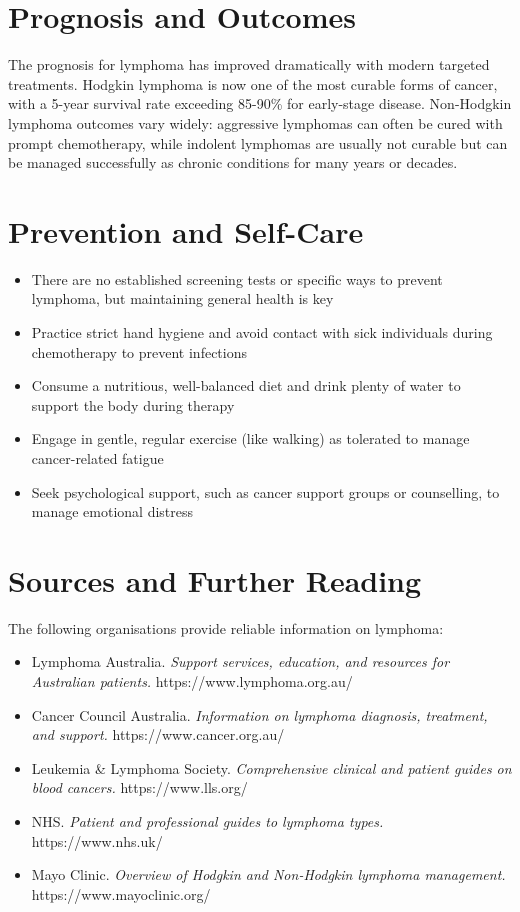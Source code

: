 \section*{Prognosis and Outcomes}
The prognosis for lymphoma has improved dramatically with modern targeted treatments. Hodgkin lymphoma is now one of the most curable forms of cancer, with a 5-year survival rate exceeding 85-90\% for early-stage disease. Non-Hodgkin lymphoma outcomes vary widely: aggressive lymphomas can often be cured with prompt chemotherapy, while indolent lymphomas are usually not curable but can be managed successfully as chronic conditions for many years or decades.

\section*{Prevention and Self-Care}
\begin{itemize}
    \item There are no established screening tests or specific ways to prevent lymphoma, but maintaining general health is key
    \item Practice strict hand hygiene and avoid contact with sick individuals during chemotherapy to prevent infections
    \item Consume a nutritious, well-balanced diet and drink plenty of water to support the body during therapy
    \item Engage in gentle, regular exercise (like walking) as tolerated to manage cancer-related fatigue
    \item Seek psychological support, such as cancer support groups or counselling, to manage emotional distress
\end{itemize}

\section*{Sources and Further Reading}
The following organisations provide reliable information on lymphoma:

\begin{itemize}
    \item Lymphoma Australia. \textit{Support services, education, and resources for Australian patients.} https://www.lymphoma.org.au/
    \item Cancer Council Australia. \textit{Information on lymphoma diagnosis, treatment, and support.} https://www.cancer.org.au/
    \item Leukemia \& Lymphoma Society. \textit{Comprehensive clinical and patient guides on blood cancers.} https://www.lls.org/
    \item NHS. \textit{Patient and professional guides to lymphoma types.} https://www.nhs.uk/
    \item Mayo Clinic. \textit{Overview of Hodgkin and Non-Hodgkin lymphoma management.} https://www.mayoclinic.org/
\end{itemize}

